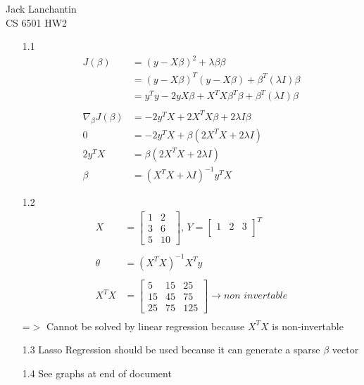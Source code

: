 \documentclass{article}
\begin{document}
\noindent Jack Lanchantin\\
CS 6501 HW2

\begin{enumerate}

\item[1.1]
\begin{align*}
	J(\beta) & = (y-X\beta)^2 + \lambda\beta\beta \\
	& = (y-X\beta)^T(y-X\beta) + \beta^T(\lambda I)\beta \\
	& = y^Ty - 2yX\beta + X^TX\beta^T\beta + \beta^T(\lambda I)\beta \\
			\\
	\nabla_\beta J(\beta) & = -2y^TX + 2X^TX\beta + 2\lambda I \beta \\
	0 & = -2y^TX + \beta(2X^TX + 2\lambda I) \\
	2y^TX & = \beta(2X^TX + 2\lambda I) \\
	\beta & = (X^TX + \lambda I)^{-1} y^TX 
\end{align*}

\item[1.2]
\begin{align*}
	X & =
	\begin{bmatrix}
	  1 & 2 \\
	  3 & 6 \\
	  5 & 10
	\end{bmatrix}, 
	\,Y = 
	\begin{bmatrix}
	  1 & 2 & 3 \\
	\end{bmatrix}^T \\
	\\
	\theta & = (X^TX)^{-1}X^Ty \\ \\
	X^TX & = 
	\begin{bmatrix}
	  5 & 15 & 25 \\
	  15 & 45 & 75\\
	  25 & 75 & 125
	\end{bmatrix} \longrightarrow non\,\,invertable \\
\end{align*}
=$>$ Cannot be solved by linear regression because $X^TX$ is non-invertable\\

\item[1.3]
Lasso Regression should be used because it can generate a sparse $\beta$ vector

\item[1.4]
See graphs at end of document


\end{enumerate}
\end{document}
